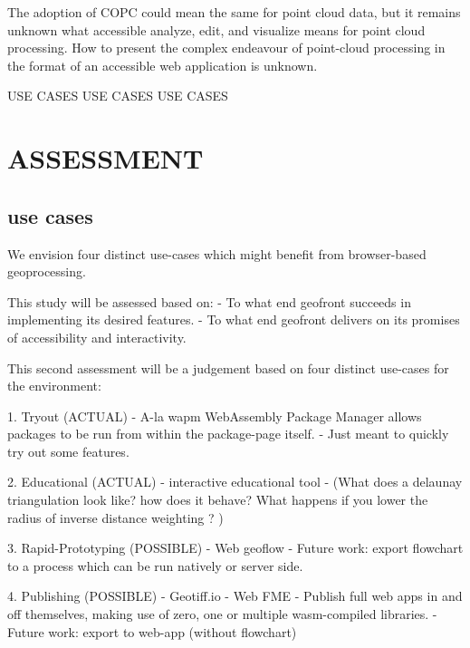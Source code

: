 The adoption of COPC could mean the same for point cloud data, but it remains unknown what accessible analyze, edit, and visualize means for point cloud processing. 
How to present the complex endeavour of point-cloud processing in the format of an accessible web application is unknown. 






USE CASES USE CASES USE CASES

\section*{ASSESSMENT}


\subsection{use cases}
We envision four distinct use-cases which might benefit from browser-based geoprocessing.

This study will be assessed based on: 
- To what end geofront succeeds in implementing its desired features.
- To what end geofront delivers on its promises of accessibility and interactivity.

This second assessment will be a judgement based on four distinct use-cases for the environment:

1. Tryout (ACTUAL)
   - A-la wapm WebAssembly Package Manager allows packages to be run from within the package-page itself. 
  - Just meant to quickly try out some features.

2. Educational (ACTUAL)
   - interactive educational tool
   - (What does a delaunay triangulation look like? how does it behave? What happens if you lower the radius of inverse distance weighting ? )

3. Rapid-Prototyping (POSSIBLE)
   - Web geoflow
   - Future work: export flowchart to a process which can be run natively or server side.

4. Publishing (POSSIBLE)
   - Geotiff.io
   - Web FME 
   - Publish full web apps in and off themselves, making use of zero, one or multiple wasm-compiled libraries.  
   - Future work: export to web-app (without flowchart)
